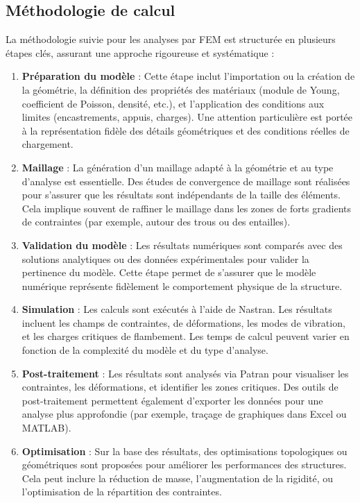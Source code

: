 \subsection{Méthodologie de calcul}

La méthodologie suivie pour les analyses par \acrshort{FEM} est structurée en plusieurs 
étapes clés, assurant une approche rigoureuse et systématique :

\begin{enumerate}
    \item \textbf{Préparation du modèle} :
    Cette étape inclut l'importation ou la création de la géométrie, la définition des 
    propriétés des matériaux (module de Young, coefficient de Poisson, densité, etc.), 
    et l'application des conditions aux limites (encastrements, appuis, charges). Une 
    attention particulière est portée à la représentation fidèle des détails géométriques
     et des conditions réelles de chargement.

    \item \textbf{Maillage} :
    La génération d'un maillage adapté à la géométrie et au type d'analyse est 
    essentielle. Des études de convergence de maillage sont réalisées pour s'assurer 
    que les résultats sont indépendants de la taille des éléments. Cela implique souvent 
    de raffiner le maillage dans les zones de forts gradients de contraintes (par 
    exemple, autour des trous ou des entailles).

    \item \textbf{Validation du modèle} :
    Les résultats numériques sont comparés avec des solutions analytiques ou des données
     expérimentales pour valider la pertinence du modèle. Cette étape permet de s'assurer
      que le modèle numérique représente fidèlement le comportement physique de la 
      structure.

    \item \textbf{Simulation} :
    Les calculs sont exécutés à l'aide de Nastran. Les résultats incluent les champs de 
    contraintes, de déformations, les modes de vibration, et les charges critiques de 
    flambement. Les temps de calcul peuvent varier en fonction de la complexité du 
    modèle et du type d'analyse.

    \item \textbf{Post-traitement} :
    Les résultats sont analysés via Patran pour visualiser les contraintes, les 
    déformations, et identifier les zones critiques. Des outils de post-traitement 
    permettent également d'exporter les données pour une analyse plus approfondie 
    (par exemple, traçage de graphiques dans Excel ou MATLAB).

    \item \textbf{Optimisation} :
    Sur la base des résultats, des optimisations topologiques ou géométriques sont 
    proposées pour améliorer les performances des structures. Cela peut inclure la 
    réduction de masse, l'augmentation de la rigidité, ou l'optimisation de la 
    répartition des contraintes.
\end{enumerate}


